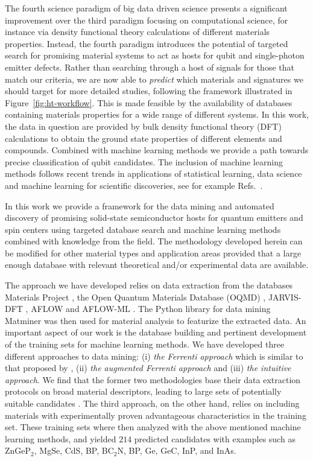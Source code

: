 \documentclass[superscriptaddress,unsortedaddress,
 amsmath,amssymb,
 aps,
]{revtex4-2}
\begin{document}
The fourth science paradigm of big data driven science presents a significant improvement over the third paradigm focusing on computational science, for instance via density functional theory calculations of different materials properties. Instead, the fourth paradigm  introduces the potential of targeted search for promising material systems to act as hosts for qubit and single-photon emitter defects.  
Rather than searching through a host of signals for those that match our criteria, we are now able to \textit{predict} which materials and signatures we should target for more detailed studies, following the framework illustrated in Figure~\ref{fig:ht-workflow}. 
This is made feasible by the availability of databases containing materials properties for a wide range of different systems. In this work, the data in question are provided by bulk density functional theory (DFT) calculations to obtain the ground state properties of different elements and compounds. Combined with machine learning methods we provide a path towards precise classification of qubit candidates. The inclusion of machine learning methods follows recent trends in applications of statistical learning, data science and machine learning for scientific discoveries, see for example Refs.~\cite{deiana2021,Carleo2019}.

In this work we provide a framework for the data mining and automated discovery of promising solid-state semiconductor hosts for quantum emitters and spin centers using targeted database search and machine learning methods combined with knowledge from the field. The methodology developed herein can be modified for other material types and application areas provided that a large enough database with relevant theoretical and/or experimental data are available. 

The approach we have developed relies on data extraction from the databases Materials Project \cite{Jain2013,Jain2018}, the Open Quantum Materials Database (OQMD) \cite{Saal2013, Kirklin2015}, JARVIS-DFT \cite{Choudhary2020}, AFLOW \cite{Curtarolo2012, Curtarolo2012a, Calderon2015} and AFLOW-ML \cite{Isayev2017}. 
The Python library for data mining Matminer \cite{Ward2018} was then used for material analysis to featurize the extracted data. An important aspect of our work is the database building and pertinent development of the training sets for machine learning methods. We have developed three different approaches to data mining: (i) \emph{the Ferrenti approach} which is similar to that proposed by \citeauthor{Ferrenti2020}  \cite{Ferrenti2020}, (ii) \emph{the augmented Ferrenti approach} and (iii) \emph{the intuitive approach}. We find that the former two methodologies base their data extraction protocols on broad material descriptors, leading to large sets of potentially suitable candidates \cite{Mehta2019,Hastie2009}. The third approach, on the other hand, relies on including materials with experimentally proven advantageous characteristics in the training set. These training sets where then analyzed with the above mentioned machine learning methods, and yielded $214$ predicted candidates 
with examples such as ZnGeP$_2$, MgSe, CdS, BP, BC$_2$N, BP, Ge, GeC, InP, and InAs. 
\end{document}
